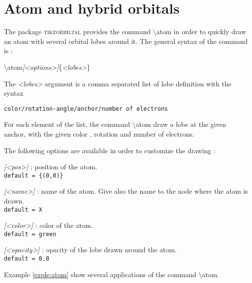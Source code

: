 \documentclass[10pt]{article}
\newcommand*{\cmd}[1]{{\ttfamily\color{blue!50!black}$\setminus$#1}\xspace}
\newcommand*{\opt}[1]{{\ttfamily\itshape\color{green!60!black}[<#1>]}\xspace}
\newcommand*{\marg}[1]{{\ttfamily\itshape\color{red!95!black}<#1>}\xspace}
\newcommand{\package}{\textsc{\sffamily\color{blue!50!black}tikzorbiltal}\xspace}
\begin{document}
\clearpage
\section{Atom and hybrid orbitals}

The package \package provides the command \cmd{atom} in order to quickly draw an atom with several orbital lobes around it. The general syntax of the command is :

\cmd{atom}\opt{options}\{\marg{lobes}\}

The \marg{lobes} argument is a comma separated list of lobe definition with the syntax 

\texttt{color/rotation-angle/anchor/number of electrons}

For each element of the list, the command \cmd{atom} draw a lobe at the given anchor, with the given color , rotation and number of electrons.

The following options are available in order to customize the drawing :

\begin{description}
    \item \opt{pos} : position of the atom.\\
    \texttt{default = \{(0,0)\}}
    
    \item \opt{name} : name of the atom. Give also the name to the node where the atom is drawn.\\
    \texttt{default = X}
    
    \item \opt{color} : color of the atom.\\
    \texttt{default = green}
    
    \item \opt{opacity} : opacity of the lobe drawn around the atom.\\
    \texttt{default = 0.8}
\end{description}

Example \ref{exple:atom} show several applications of the command \cmd{atom}.
\end{document}

